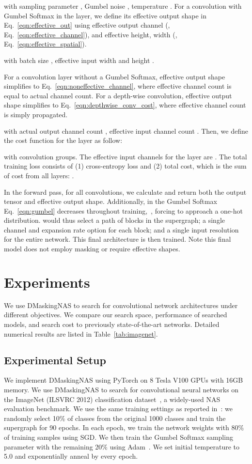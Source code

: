 \documentclass[10pt,twocolumn,letterpaper]{article}
\begin{document}
with sampling parameter , Gumbel noise , temperature . For a convolution with Gumbel Softmax in the  layer, we define its effective output shape  in Eq.~\ref{eqn:effective_out} using effective output channel (, Eq.~\ref{eqn:effective_channel}), and effective height, width (, Eq.~\ref{eqn:effective_spatial}).



with batch size , effective input width  and height .

For a convolution layer without a Gumbel Softmax, effective output shape simplifies to Eq.~\ref{eqn:noneffective_channel}, where effective channel count is equal to actual channel count. For a depth-wise convolution, effective output shape simplifies to Eq.~\ref{eqn:depthwise_conv_cost}, where effective channel count is simply propagated.


with actual output channel count , effective input channel count . Then, we define the cost function for the  layer as follow:


with  convolution groups. The effective input channels for the  layer are . The total training loss consists of (1) cross-entropy loss and (2) total cost, which is the sum of cost from all layers: 
.

In the forward pass, for all convolutions, we calculate and return both the output tensor and effective output shape. Additionally,  in the Gumbel Softmax Eq.~\ref{eqn:gumbel} decreases throughout training,~\cite{gumbel}, forcing  to approach a one-hot distribution.  would thus select a path of blocks in the supergraph; a single channel and expansion rate option for each block; and a single input resolution for the entire network. This final architecture is then trained. Note this final model does not employ masking or require effective shapes. 

\section{Experiments}

We use DMaskingNAS to search for convolutional network architectures under different objectives.  We compare our search space, performance of searched models, and search cost to previously state-of-the-art networks. Detailed numerical results are listed in Table~\ref{tab:imagenet}.

\subsection{Experimental Setup}
We implement DMaskingNAS using PyTorch on 8 Tesla V100 GPUs with 16GB memory. We use DMaskingNAS to search for convolutional neural networks on the ImageNet (ILSVRC 2012) classification dataset~\cite{imagenet}, a widely-used NAS evaluation benchmark. We use the same training settings as reported in~\cite{fbnet}: we randomly select 10\% of classes from the original 1000 classes and train the supergraph for 90 epochs. In each epoch, we train the network weights with 80\% of training samples using SGD. We then train the Gumbel Softmax sampling parameter  with the remaining 20\% using Adam~\cite{kingma2014adam}. We set initial temperature  to 5.0 and exponentially anneal by  every epoch.
\end{document}
